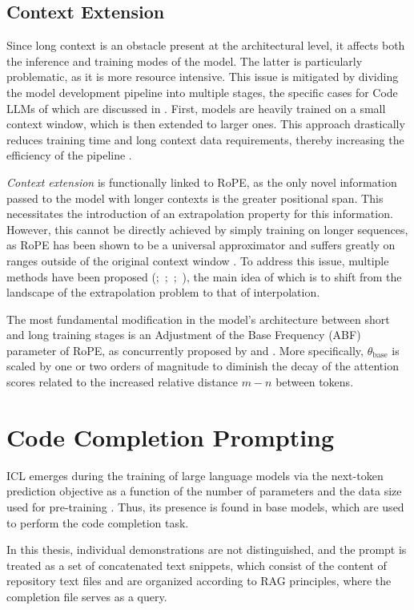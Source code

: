 \subsection{Context Extension}

Since long context is an obstacle present at the architectural level, it affects both the inference and training modes of the model. The latter is particularly problematic, as it is more resource intensive. This issue is mitigated by dividing the model development pipeline into multiple stages, the specific cases for Code LLMs of which are discussed in . First, models are heavily trained on a small context window, which is then extended to larger ones. This approach drastically reduces training time and long context data requirements, thereby increasing the efficiency of the pipeline \parencite{xiong2023}.

\textit{Context extension} is functionally linked to RoPE, as the only novel information passed to the model with longer contexts is the greater positional span. This necessitates the introduction of an extrapolation property for this information. However, this cannot be directly achieved by simply training on longer sequences, as RoPE has been shown to be a universal approximator and suffers greatly on ranges outside of the original context window \parencite{chen2023}. To address this issue, multiple methods have been proposed (\cite{chen2023};~\cite{rozière2023};~\cite{peng2023};~\cite{xiong2023}), the main idea of which is to shift from the landscape of the extrapolation problem to that of interpolation.

The most fundamental modification in the model's architecture between short and long training stages is an Adjustment of the Base Frequency (ABF) parameter of RoPE, as concurrently proposed by \citet{rozière2023} and \citet{xiong2023}. More specifically, \(\theta_{\mathrm{base}}\) is scaled by one or two orders of magnitude to diminish the decay of the attention scores related to the increased relative distance \(m - n\) between tokens.

\section{Code Completion Prompting}

ICL emerges during the training of large language models via the next-token prediction objective as a function of the number of parameters and the data size used for pre-training \parencite{hahn2023}. Thus, its presence is found in base models, which are used to perform the code completion task.

In this thesis, individual demonstrations are not distinguished, and the prompt is treated as a set of concatenated text snippets, which consist of the content of repository text files and are organized according to RAG principles, where the completion file serves as a query.
